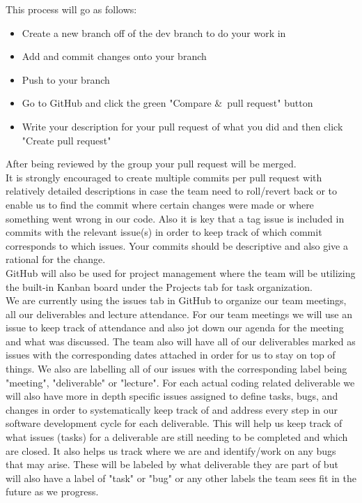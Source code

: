 \documentclass{article}
\begin{document}
This process will go as follows:
\begin{itemize}
  \item Create a new branch off of the dev branch to do your work in
    \item Add and commit changes onto your branch
  \item Push to your branch
\item Go to GitHub and click the green "Compare \&\ pull request" button
  \item Write your description for your pull request of what you did and then click "Create pull request"
\end{itemize}

After being reviewed by the group your pull request will be merged.\\

It is strongly encouraged to create multiple commits per pull request with relatively detailed descriptions in case the team need to roll/revert back or to enable us to find the commit where certain changes were made or where something went wrong in our code. Also it is key that a tag issue is included in commits with the relevant issue(s) in order to keep track of which commit corresponds to which issues. Your commits should be descriptive and also give a rational for the change.\\

GitHub will also be used for project management where the team will be utilizing the built-in Kanban board under the Projects tab for task organization. \\

We are currently using the issues tab in GitHub to organize our team meetings, all our deliverables and lecture attendance. For our team meetings we will use an issue to keep track of attendance and also jot down our agenda for the meeting and what was discussed. The team also will have all of our deliverables marked as issues with the corresponding dates attached in order for us to stay on top of things. We also are labelling all of our issues with the corresponding label being "meeting", "deliverable" or "lecture". For each actual coding related deliverable we will also have more in depth specific issues assigned to define tasks, bugs, and changes in order to systematically keep track of and address every step in our software development cycle for each deliverable. This will help us keep track of what issues (tasks) for a deliverable are still needing to be completed and which are closed. It also helps us track where we are and identify/work on any bugs that may arise. These will be labeled by what deliverable they are part of but will also have a label of "task" or "bug" or any other labels the team sees fit in the future as we progress.
\end{document}

